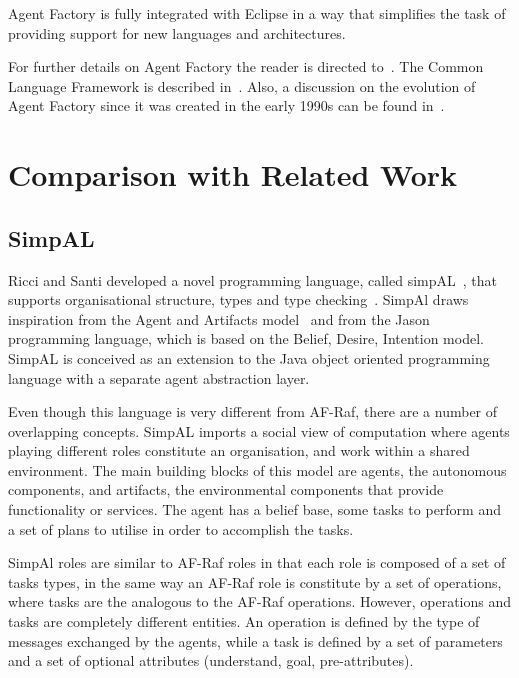 \documentclass[a4paper,12pt,oneside,fleqn]{book} %
\begin{document}
Agent Factory is fully integrated with Eclipse in a way that simplifies
the task of providing support for new languages and architectures.

For further details on Agent Factory the reader is directed
to~\cite{collier2009modeling}. The Common Language Framework is described
in~\cite{russell2011af}. Also, a discussion on the evolution of Agent
Factory since it was created in the early 1990s can be found
in~\cite{muldoon2009towards}.

\chapter{Comparison with Related Work}\label{ch:related} %

\section{SimpAL} %
Ricci  and Santi developed a novel programming language, called
simpAL~\cite{DBLP:conf/oopsla/RicciS11,DBLP:conf/oopsla/RicciS12}, that
supports organisational structure, types and type
checking~\cite{DBLP:conf/promas/RicciS12}. SimpAl draws inspiration from
the Agent and Artifacts model~\cite{DBLP:conf/atal/RicciVO07} and from the
Jason programming language, which is based on the Belief, Desire, Intention
model. SimpAL is conceived as an extension to the Java object oriented
programming language with a separate agent abstraction layer.

Even though this language is very different from AF-Raf, there are a number
of overlapping concepts. SimpAL imports a social view of computation where
agents playing different roles constitute an organisation, and work within
a shared environment. The main building blocks of this model are agents,
the autonomous components, and artifacts, the environmental components that
provide functionality or services. The agent has a belief base, some tasks
to perform and a set of plans to utilise in order to accomplish the tasks.

SimpAl roles are similar to AF-Raf roles in that each role is composed of a
set of tasks types, in the same way an AF-Raf role is constitute by a set
of operations, where tasks are the analogous to the AF-Raf operations.
However, operations and tasks are completely different entities. An
operation is defined by the type of messages exchanged by the agents, while
a task is defined by a set of parameters and a set of optional attributes
(understand, goal, pre-attributes).
\end{document}
